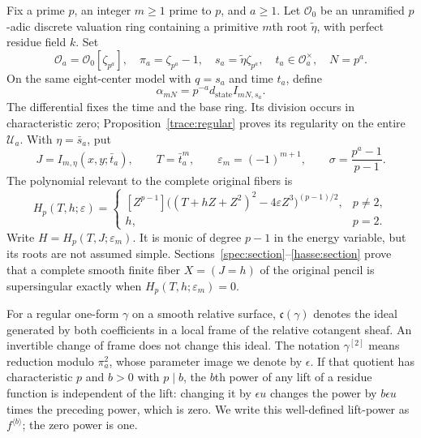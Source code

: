 Fix a prime $p$, an integer $m\ge1$ prime to $p$, and $a\ge1$.
Let $\mathcal O_0$ be an unramified $p$-adic discrete valuation ring
containing a primitive $m$th root $\widetilde\eta$, with perfect
residue field $k$. Set
\[
 \mathcal O_a=\mathcal O_0[\zeta_{p^a}],\quad
 \pi_a=\zeta_{p^a}-1,\quad s_a=\widetilde\eta\zeta_{p^a},\quad
 t_a\in\mathcal O_a^\times,\quad N=p^a.
\]
On the same eight-center model with $q=s_a$ and time $t_a$, define
\begin{equation}
 \alpha_{mN}=p^{-a}d_{\mathrm{state}}I_{mN,s_a}.
 \label{main:alpha}
\end{equation}
The differential fixes the time and the base ring. Its division occurs
in characteristic zero; Proposition~\ref{trace:regular} proves its
regularity on the entire $\mathcal U_a$.
With $\eta=\bar s_a$, put
\[
 J=I_{m,\eta}(x,y;\bar t_a),\qquad T=\bar t_a^m,\qquad
 \varepsilon_m=(-1)^{m+1},\qquad \sigma=\frac{p^a-1}{p-1}.
\]
The polynomial relevant to the complete original fibers is
\begin{equation}
 H_p(T,h;\varepsilon)=
 \begin{cases}
 [Z^{p-1}]\bigl((T+hZ+Z^2)^2-4\varepsilon Z^3\bigr)^{(p-1)/2},&p\ne2,\\
 h,&p=2.
 \end{cases}
 \label{main:hasse}
\end{equation}
Write $H=H_p(T,J;\varepsilon_m)$. It is monic of degree $p-1$ in
the energy variable, but its roots are not assumed simple.
Sections~\ref{spec:section}--\ref{hasse:section} prove that a complete
smooth finite fiber $X=(J=h)$ of the original pencil is supersingular
exactly when $H_p(T,h;\varepsilon_m)=0$.

For a regular one-form $\gamma$ on a smooth relative surface,
$\mathfrak c(\gamma)$ denotes the ideal generated by both coefficients
in a local frame of the relative cotangent sheaf. An invertible change
of frame does not change this ideal. The notation $\gamma^{[2]}$
means reduction modulo $\pi_a^2$, whose parameter image we denote by
$\epsilon$. If that quotient has characteristic $p$ and $b>0$ with
$p\mid b$, the $b$th power of any lift of a residue function
is independent of the lift: changing it by $\epsilon u$ changes the
power by $b\epsilon u$ times the preceding power, which is zero.
We write this well-defined lift-power as $f^{\langle b\rangle}$;
the zero power is one.

